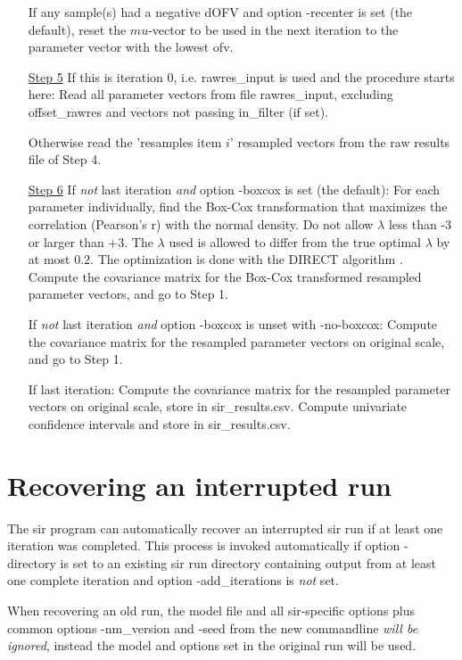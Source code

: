 \begin{itemize}
\noindent If any sample(s) had a negative dOFV and option -recenter is set (the default), reset the $mu$-vector
to be used in the next iteration to the parameter vector with the lowest ofv.
\item[\underline{Step 5}]
If this is iteration $0$, i.e. rawres\_input is used and the procedure starts here: Read all parameter vectors
from file rawres\_input, excluding offset\_rawres and vectors not passing in\_filter (if set).

\noindent Otherwise read the 'resamples item $i$' resampled vectors from the raw results file of Step 4.
\item[\underline{Step 6}]
If \emph{not} last iteration \emph{and} option -boxcox is set (the default): 
For each parameter individually, find the Box-Cox transformation that maximizes the correlation (Pearson's r) with the normal density.
Do not allow $\lambda$ less than -3 or larger than +3. The  $\lambda$ used is allowed to differ from the true optimal  $\lambda$
by at most $0.2$. The optimization is done with the DIRECT algorithm \cite{direct}.
Compute the covariance matrix for the Box-Cox transformed resampled parameter vectors, and go to Step 1.

\noindent If \emph{not} last iteration \emph{and} option -boxcox is unset with -no-boxcox: 
Compute the covariance matrix for the resampled parameter vectors on original scale, and go to Step 1.

\noindent If last iteration: 
Compute the covariance matrix for the resampled parameter vectors on original scale, 
store in sir\_results.csv. 
Compute univariate confidence intervals and store in sir\_results.csv.
\end{itemize}

\section{Recovering an interrupted run}
The sir program can automatically recover an interrupted sir run
if at least one iteration was completed. This process is invoked automatically
if option -directory is set to an existing sir run directory containing output from
at least one complete iteration and option -add\_iterations is \emph{not} set.

When recovering an old run, the model file and all sir-specific options plus common options 
-nm\_version and -seed from
the new commandline \emph{will be ignored}, instead the model and options
set in the original run will be used.

